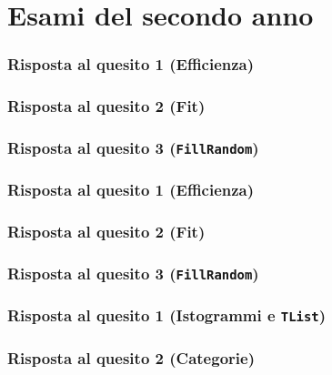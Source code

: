 \documentclass{article}
\begin{document}
\section{Esami del secondo anno}

\subsubsection{Risposta al quesito 1 (Efficienza)}

\subsubsection{Risposta al quesito 2 (Fit)}

\subsubsection{Risposta al quesito 3 (\texttt{FillRandom})}


\subsubsection{Risposta al quesito 1 (Efficienza)}

\subsubsection{Risposta al quesito 2 (Fit)}

\subsubsection{Risposta al quesito 3 (\texttt{FillRandom})}


\subsubsection{Risposta al quesito 1 (Istogrammi e \texttt{TList})}

\subsubsection{Risposta al quesito 2 (Categorie)}

\end{document}
